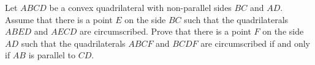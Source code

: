 Let $ABCD$ be a convex quadrilateral with non-parallel sides $BC$ and $AD$. Assume that there is a point $E$ on the side $BC$ such that the quadrilaterals $ABED$ and $AECD$ are circumscribed. Prove that there is a point $F$ on the side $AD$ such that the quadrilaterals $ABCF$ and $BCDF$ are circumscribed if and only if $AB$ is parallel to $CD$.
